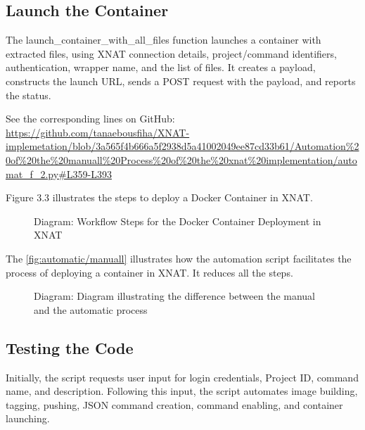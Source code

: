 \subsection{Launch the Container}

The launch\_container\_with\_all\_files function launches a container with extracted files, using XNAT connection details, project/command identifiers, authentication, wrapper name, and the list of files. It creates a payload, constructs the launch URL, sends a POST request with the payload, and reports the status.




\noindent\footnotesize See the corresponding lines on GitHub:\url{ https://github.com/tanaebousfiha/XNAT-implemetation/blob/3a565f4b666a5f2938d5a41002049ee87cd33b61/Automation%20of%20the%20manuall%20Process%20of%20the%20xnat%20implementation/automat_f_2.py#L359-L393}




Figure 3.3 illustrates the steps to deploy a Docker Container in XNAT.


\begin{figure}[ht]
    \centering
    \def\svgwidth{0.9\linewidth}
    
    \caption{Diagram: Workflow Steps for the Docker Container Deployment in XNAT}
    \label{fig:workflow-steps}
\end{figure}


The \autoref{fig:automatic/manuall} illustrates how the automation script facilitates the process of deploying a container in XNAT. It reduces all the steps.

\begin{figure}[ht]
    \centering
    \def\svgwidth{0.9\linewidth}
    
    \caption{Diagram: Diagram illustrating the difference between the manual and the automatic process}
    \label{fig:automatic/manuall}
\end{figure}



\subsection{Testing the Code}
Initially, the script requests user input for login credentials, Project ID, command name, and description. Following this input, the script automates image building, tagging, pushing, JSON command creation, command enabling, and container launching.

